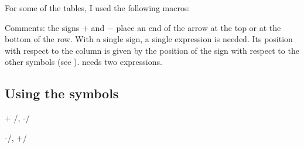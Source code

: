 \medskip
For some of the tables, I used the following macros:

\begin{tkzexample}
	\newcommand*{\va}{\colorbox{red!50}    {$\scriptscriptstyle V_a$}}
	\newcommand*{\vb}{\colorbox{blue!50}   {$\scriptscriptstyle V_b$}}
	\newcommand*{\vbo}{\colorbox{blue!50}  {$\scriptscriptstyle V_{b1}$}}
	\newcommand*{\vbt}{\colorbox{yellow!50}{$\scriptscriptstyle V_{b2}$}}
	\newcommand*{\vc}{\colorbox{gray!50}   {$\scriptscriptstyle V_c$}}
	\newcommand*{\vd}{\colorbox{magenta!50}{$\scriptscriptstyle V_d$}}
	\newcommand*{\ve}{\colorbox{orange!50} {$\scriptscriptstyle V_e$}}
\end{tkzexample}

\medskip
 \begin{center}
\end{center}

\begin{tkzexample}
\end{tkzexample}

Comments: the signs $+$ and $-$ place an end of the arrow at the top or at the bottom of the row. With a single sign, a single expression is needed. Its position with respect to the column is given by the position of the sign with respect to the other symbols (see ).  needs two expressions.

\subsection{Using the symbols}

\medskip
\bgroup\parindent=0pt
\begin{minipage}{7cm}
\begin{tkzexample}
 {+ /\va , -/\vb }
\end{tkzexample}
\end{minipage}
\hfill
\begin{minipage}{7cm}
\begin{tkzexample}
 {-/\va   ,   +/\vb}
\end{tkzexample}
\end{minipage}


